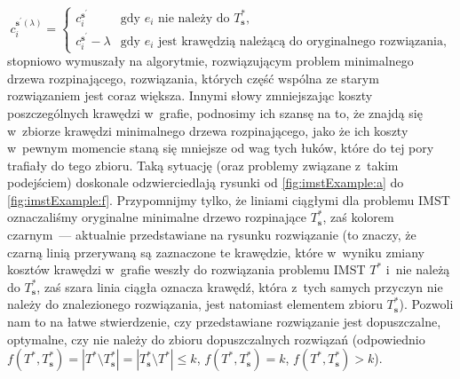 \begin{equation}
	c^{\textbf{s}^{\prime} \left( \lambda \right)}_{i} = \left\{\begin{matrix}
		c^{\textbf{s}^{\prime}}_{i} & \text{gdy $e_{i}$ nie należy do $T^{\ast}_{\textbf{s}}$,}\\ 
		c^{\textbf{s}^{\prime}}_{i} - \lambda & \text{gdy $e_{i}$ jest krawędzią należącą do oryginalnego rozwiązania,}
	\end{matrix}\right.
\end{equation}
stopniowo wymuszały na algorytmie, rozwiązującym problem minimalnego drzewa rozpinającego, rozwiązania, których część wspólna ze starym rozwiązaniem jest coraz większa.
Innymi słowy zmniejszając koszty poszczególnych krawędzi w~grafie, podnosimy ich szansę na to, że znajdą się w~zbiorze krawędzi minimalnego drzewa rozpinającego, jako że ich koszty w~pewnym momencie staną się mniejsze od wag tych łuków, które do tej pory trafiały do tego zbioru.
Taką sytuację (oraz problemy związane z~takim podejściem) doskonale odzwierciedlają rysunki od \ref{fig:imstExample:a} do \ref{fig:imstExample:f}.
Przypomnijmy tylko, że liniami ciągłymi dla problemu \textsc{IMST} oznaczaliśmy oryginalne minimalne drzewo rozpinające $T^{\ast}_{\textbf{s}}$, zaś kolorem czarnym~--- aktualnie przedstawiane na rysunku rozwiązanie (to znaczy, że czarną linią przerywaną są zaznaczone te krawędzie, które w~wyniku zmiany kosztów krawędzi w~grafie weszły do rozwiązania problemu \textsc{IMST} $T^{\ast}$ i~nie należą do $T^{\ast}_{\textbf{s}}$, zaś szara linia ciągła oznacza krawędź, która z~tych samych przyczyn nie należy do znalezionego rozwiązania, jest natomiast elementem zbioru $T^{\ast}_{\textbf{s}}$).
Pozwoli nam to na łatwe stwierdzenie, czy przedstawiane rozwiązanie jest dopuszczalne, optymalne, czy nie należy do zbioru dopuszczalnych rozwiązań (odpowiednio $f \left( T^{\ast}, T^{\ast}_{\textbf{s}} \right) = \left| T^{\ast} \setminus T^{\ast}_{\textbf{s}} \right| = \left| T^{\ast}_{\textbf{s}} \setminus T^{\ast} \right| \leqslant k$, $f \left( T^{\ast}, T^{\ast}_{\textbf{s}} \right) = k$, $f \left( T^{\ast}, T^{\ast}_{\textbf{s}} \right) > k$).

